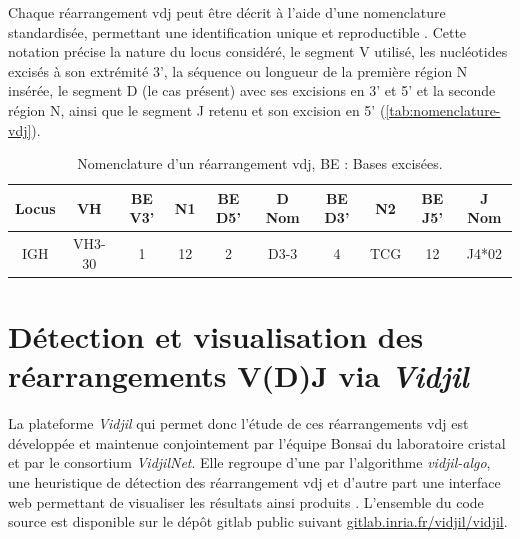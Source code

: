 

Chaque réarrangement \gls{vdj} peut être décrit à l'aide d'une nomenclature standardisée, 
permettant une identification unique et reproductible \cite{laneIMGTONTOLOGYIMGTLIGMotif2010,lefrancIMGT30Years2019}. 
Cette notation précise la nature du locus considéré, le segment V utilisé, les nucléotides excisés à son extrémité 3', 
la séquence ou longueur de la première région N insérée, le segment D (le cas présent) avec ses excisions en 3' et 5' 
et la seconde région N, ainsi que le segment J retenu et son excision en 5' (\autoref{tab:nomenclature-vdj}).

\begin{table}[H]
    \centering
    \caption{Nomenclature d'un réarrangement \gls{vdj}, BE : Bases excisées.}
    \label{tab:nomenclature-vdj}
    \begin{tabular}{c c c c c c c c c c}
        \toprule
        \textbf{Locus} & \textbf{VH} & \textbf{BE V3'} & \textbf{N1} & \textbf{BE D5'} & 
        \textbf{D Nom} & \textbf{BE D3'} & \textbf{N2} & \textbf{BE J5'} & \textbf{J Nom} \\        
        \midrule IGH & VH3-30 & 1 & 12 & 2 & D3-3 & 4 & TCG & 12 & J4*02 \\
        \bottomrule
    \end{tabular}
\end{table}


\section{Détection et visualisation des réarrangements V(D)J via \textit{Vidjil}}

La plateforme \textit{Vidjil} qui permet donc l'étude de ces réarrangements \gls{vdj} est développée et maintenue 
conjointement par l'équipe Bonsai du laboratoire \gls{cristal} et par le consortium \textit{VidjilNet}. 
Elle regroupe d'une par l'algorithme \textit{vidjil-algo}, une heuristique de détection des réarrangement \gls{vdj} 
\cite{giraudFastMulticlonalClusterization2014b} et d'autre part une interface web permettant de visualiser les 
résultats ainsi produits \cite{duezVidjilWebPlatform2016}. L'ensemble du code source est disponible sur le dépôt gitlab 
public suivant \href{https://gitlab.inria.fr/vidjil/vidjil}{gitlab.inria.fr/vidjil/vidjil}.

\vspace{1em}

